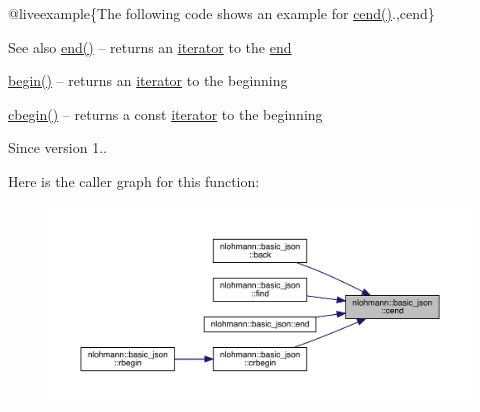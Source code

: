 @liveexample\{The following code shows an example for {\ttfamily \mbox{\hyperlink{classnlohmann_1_1basic__json_a8dba7b7d2f38e6b0c614030aa43983f6}{cend()}}}.,cend\}

\begin{DoxySeeAlso}{See also}
\mbox{\hyperlink{classnlohmann_1_1basic__json_a13e032a02a7fd8a93fdddc2fcbc4763c}{end()}} -- returns an \mbox{\hyperlink{classnlohmann_1_1basic__json_a099316232c76c034030a38faa6e34dca}{iterator}} to the \mbox{\hyperlink{classnlohmann_1_1basic__json_a13e032a02a7fd8a93fdddc2fcbc4763c}{end}} 

\mbox{\hyperlink{classnlohmann_1_1basic__json_a0ff28dac23f2bdecee9564d07f51dcdc}{begin()}} -- returns an \mbox{\hyperlink{classnlohmann_1_1basic__json_a099316232c76c034030a38faa6e34dca}{iterator}} to the beginning 

\mbox{\hyperlink{classnlohmann_1_1basic__json_ad865d6c291b237ae508d5cb2146b5877}{cbegin()}} -- returns a const \mbox{\hyperlink{classnlohmann_1_1basic__json_a099316232c76c034030a38faa6e34dca}{iterator}} to the beginning
\end{DoxySeeAlso}
\begin{DoxySince}{Since}
version 1.. 
\end{DoxySince}
Here is the caller graph for this function\+:
\nopagebreak
\begin{figure}[H]
\begin{center}
\leavevmode
\includegraphics[width=350pt]{classnlohmann_1_1basic__json_a8dba7b7d2f38e6b0c614030aa43983f6_icgraph}
\end{center}
\end{figure}
\mbox{\label{classnlohmann_1_1basic__json_abfeba47810ca72f2176419942c4e1952}} 
